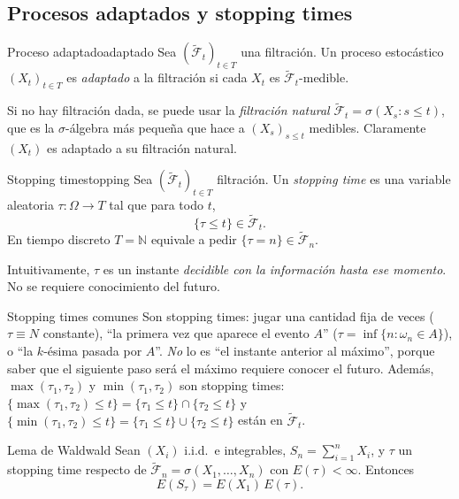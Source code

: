 \documentclass[11pt, a4paper]{article}
\begin{document}
\subsection{Procesos adaptados y stopping times}

\begin{definicion}{Proceso adaptado}{adaptado}
Sea $(\widetilde{\mathcal{F}}_t)_{t \in T}$ una filtración. Un proceso estocástico
$(X_t)_{t \in T}$ es \emph{adaptado} a la filtración si cada $X_t$ es
$\widetilde{\mathcal{F}}_t$-medible.
\end{definicion}

\obs Si no hay filtración dada, se puede usar la \emph{filtración natural}
$\widetilde{\mathcal{F}}_t = \sigma(X_s : s \le t)$, que es la $\sigma$-álgebra más pequeña que
hace a $(X_s)_{s \le t}$ medibles. Claramente $(X_t)$ es adaptado a su filtración natural.

\begin{definicion}{Stopping time}{stopping}
Sea $(\widetilde{\mathcal{F}}_t)_{t \in T}$ filtración. Un \emph{stopping time} es una variable
aleatoria $\tau: \Omega \to T$ tal que para todo $t$,
$$ \{\tau \le t\} \in \widetilde{\mathcal{F}}_t. $$
En tiempo discreto $T = \mathbb{N}$ equivale a pedir $\{\tau = n\} \in \widetilde{\mathcal{F}}_n$.
\end{definicion}

\obs Intuitivamente, $\tau$ es un instante \emph{decidible con la información hasta ese momento}.
No se requiere conocimiento del futuro.

\begin{ejemplo}{Stopping times comunes}{}
Son stopping times: jugar una cantidad fija de veces ($\tau \equiv N$ constante), ``la primera vez
que aparece el evento $A$'' ($\tau = \inf\{n : \omega_n \in A\}$), o ``la $k$-ésima pasada por
$A$''. \emph{No} lo es ``el instante anterior al máximo'', porque saber que el siguiente paso
será el máximo requiere conocer el futuro. Además, $\max(\tau_1, \tau_2)$ y $\min(\tau_1,
\tau_2)$ son stopping times: $\{\max(\tau_1, \tau_2) \le t\} = \{\tau_1 \le t\} \cap \{\tau_2 \le
t\}$ y $\{\min(\tau_1, \tau_2) \le t\} = \{\tau_1 \le t\} \cup \{\tau_2 \le t\}$ están en
$\widetilde{\mathcal{F}}_t$.
\end{ejemplo}

\begin{teorema}{Lema de Wald}{wald}
Sean $(X_i)$ i.i.d.\ e integrables, $S_n = \sum_{i=1}^n X_i$, y $\tau$ un stopping time
respecto de $\widetilde{\mathcal{F}}_n = \sigma(X_1, \dots, X_n)$ con $E(\tau) < \infty$.
Entonces
$$ E(S_\tau) = E(X_1) \, E(\tau). $$
\end{teorema}
\end{document}
